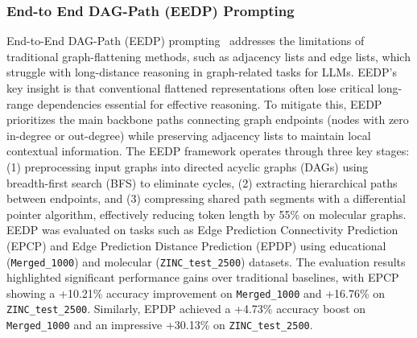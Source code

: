 \documentclass{article}
\begin{document}
\subsubsection{End-to End DAG-Path (EEDP) Prompting }
\label{EEDP}
\noindent End-to-End DAG-Path (EEDP) prompting~\citep{hong2024endtoendgraphflatteningmethod} addresses the limitations of traditional graph-flattening methods, such as adjacency lists and edge lists, which struggle with long-distance reasoning in graph-related tasks for LLMs. EEDP's key insight is that conventional flattened representations often lose critical long-range dependencies essential for effective reasoning. To mitigate this, EEDP prioritizes the main backbone paths connecting graph endpoints (nodes with zero in-degree or out-degree) while preserving adjacency lists to maintain local contextual information. The EEDP framework operates through three key stages: (1) preprocessing input graphs into directed acyclic graphs (DAGs) using breadth-first search (BFS) to eliminate cycles, (2) extracting hierarchical paths between endpoints, and (3) compressing shared path segments with a differential pointer algorithm, effectively reducing token length by 55\% on molecular graphs. EEDP was evaluated on tasks such as Edge Prediction Connectivity Prediction (EPCP) and Edge Prediction Distance Prediction (EPDP) using educational (\texttt{Merged\_1000}) and molecular (\texttt{ZINC\_test\_2500}) datasets. The evaluation results highlighted significant performance gains over traditional baselines, with EPCP showing a +10.21\% accuracy improvement on \texttt{Merged\_1000} and +16.76\% on \texttt{ZINC\_test\_2500}. Similarly, EPDP achieved a +4.73\% accuracy boost on \texttt{Merged\_1000} and an impressive +30.13\% on \texttt{ZINC\_test\_2500}.
\end{document}
